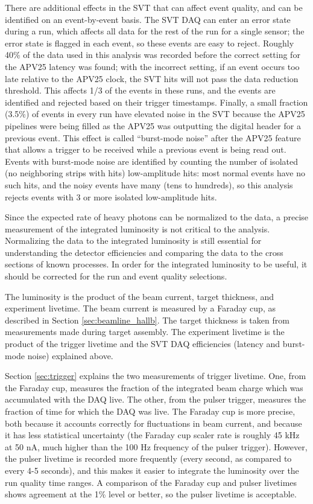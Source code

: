 There are additional effects in the SVT that can affect event quality, and can be identified on an event-by-event basis.
The SVT DAQ can enter an error state during a run, which affects all data for the rest of the run for a single sensor; the error state is flagged in each event, so these events are easy to reject.
Roughly 40\% of the data used in this analysis was recorded before the correct setting for the APV25 latency was found; with the incorrect setting, if an event occurs too late relative to the APV25 clock, the SVT hits will not pass the data reduction threshold.
This affects 1/3 of the events in these runs, and the events are identified and rejected based on their trigger timestamps.
Finally, a small fraction (3.5\%) of events in every run have elevated noise in the SVT because the APV25 pipelines were being filled as the APV25 was outputting the digital header for a previous event.
This effect is called ``burst-mode noise'' after the APV25 feature that allows a trigger to be received while a previous event is being read out.
Events with burst-mode noise are identified by counting the number of isolated (no neighboring strips with hits) low-amplitude hits: most normal events have no such hits, and the noisy events have many (tens to hundreds), so this analysis rejects events with 3 or more isolated low-amplitude hits.


Since the expected rate of heavy photons can be normalized to the data, a precise measurement of the integrated luminosity is not critical to the analysis.
Normalizing the data to the integrated luminosity is still essential for understanding the detector efficiencies and comparing the data to the cross sections of known processes.
In order for the integrated luminosity to be useful, it should be corrected for the run and event quality selections.

The luminosity is the product of the beam current, target thickness, and experiment livetime.
The beam current is measured by a Faraday cup, as described in Section \ref{sec:beamline_hallb}.
The target thickness is taken from measurements made during target assembly.
The experiment livetime is the product of the trigger livetime and the SVT DAQ efficiencies (latency and burst-mode noise) explained above.

Section \ref{sec:trigger} explains the two measurements of trigger livetime.
One, from the Faraday cup, measures the fraction of the integrated beam charge which was accumulated with the DAQ live.
The other, from the pulser trigger, measures the fraction of time for which the DAQ was live.
The Faraday cup is more precise, both because it accounts correctly for fluctuations in beam current, and because it has less statistical uncertainty (the Faraday cup scaler rate is roughly 45 kHz at 50 nA, much higher than the 100 Hz frequency of the pulser trigger).
However, the pulser livetime is recorded more frequently (every second, as compared to every 4-5 seconds), and this makes it easier to integrate the luminosity over the run quality time ranges.
A comparison of the Faraday cup and pulser livetimes shows agreement at the 1\% level or better, so the pulser livetime is acceptable.

